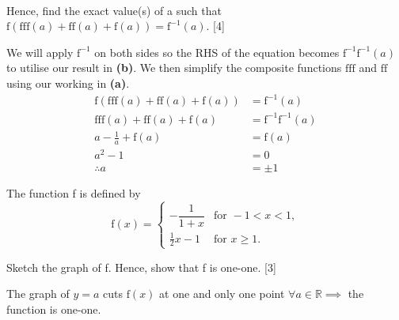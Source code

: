\documentclass[12pt, a4 paper]{article}
\begin{document}
\begin{outline}[enumerate]
\begin{answer}
\begin{align*}
  \end{align*}
 \end{answer}
 \2 Hence, find the exact value(s) of a such that \(\textrm{f}(\textrm{f}\textrm{f}\textrm{f}(a)+\textrm{f}\textrm{f}(a)+\textrm{f}(a))=\textrm{f}^{-1}(a)\). \hfill[4]
 \begin{answer}
  We will apply \(\textrm{f}^{-1}\) on both sides so the RHS of the equation becomes \(\textrm{f}^{-1}\textrm{f}^{-1}(a)\) to utilise our result in \textbf{(b)}. We then simplify the composite functions \(\textrm{f}\textrm{f}\textrm{f}\) and \(\textrm{f}\textrm{f}\) using our working in \textbf{(a)}.
  \begin{align*}
   \textrm{f}(\textrm{f}\textrm{f}\textrm{f}(a)+\textrm{f}\textrm{f}(a)+\textrm{f}(a)) & =\textrm{f}^{-1}(a)                \\
   \textrm{f}\textrm{f}\textrm{f}(a)+\textrm{f}\textrm{f}(a)+\textrm{f}(a)             & =\textrm{f}^{-1}\textrm{f}^{-1}(a) \\
   a-\frac{1}{a}+\textrm{f}(a)                                                         & =\textrm{f}(a)                     \\
   a^2-1                                                                               & =0                                 \\
   \therefore a                                                                        & =\pm 1
  \end{align*}
 \end{answer}

 \1 The function f is defined by
 \[\textrm{f}(x)=
  \begin{cases}
   -\dfrac{1}{1+x} & \textrm{for }-1<x<1, \\
   \frac{1}{2}x-1  & \textrm{for }x\geq1.
  \end{cases}
 \] %

 \2 Sketch the graph of f. Hence, show that f is one-one. \hfill[3]
 \begin{answer}
  \vspace{3mm}
  \color{black}
  \color{blue}
  The graph of \(y=a\) cuts \(\textrm{f}(x)\) at one and only one point \(\forall a\in\mathbb{R}\implies \) the function is one-one.
 \end{answer}


\end{outline}
\end{document}
